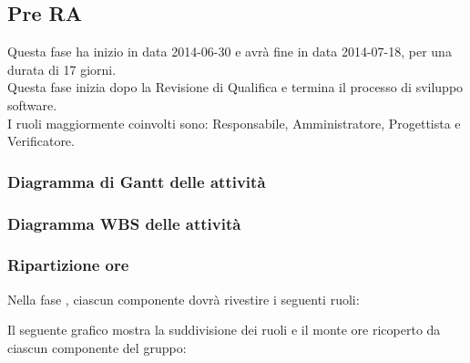 \subsection{Pre RA}
Questa fase ha inizio in data 2014-06-30 e avrà fine in data 2014-07-18, per una durata di 17 giorni.\\
Questa fase inizia dopo la Revisione di Qualifica e termina il processo di sviluppo software.\\
I ruoli maggiormente coinvolti sono: Responsabile, Amministratore, Progettista e Verificatore.


\subsubsection{Diagramma di Gantt delle attività}

\newpage
\subsubsection{Diagramma WBS delle attività}

\newpage
\subsubsection{Ripartizione ore}

\newpage
Nella fase , ciascun componente dovrà rivestire i seguenti ruoli:

Il seguente grafico mostra la suddivisione dei ruoli e il monte ore ricoperto da ciascun componente del gruppo:
